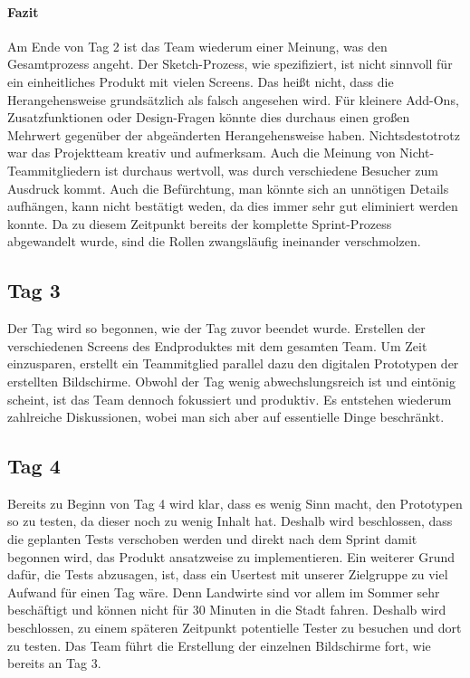 \paragraph{Fazit}
Am Ende von Tag 2 ist das Team wiederum einer Meinung, was den Gesamtprozess angeht. Der Sketch-Prozess, wie spezifiziert, ist nicht sinnvoll für ein einheitliches Produkt mit vielen Screens. Das heißt nicht, dass die Herangehensweise grundsätzlich als falsch angesehen wird. Für kleinere Add-Ons, Zusatzfunktionen oder Design-Fragen könnte dies durchaus einen großen Mehrwert gegenüber der abgeänderten Herangehensweise haben. Nichtsdestotrotz war das Projektteam kreativ und aufmerksam. Auch die Meinung von Nicht-Teammitgliedern ist durchaus wertvoll, was durch verschiedene Besucher zum Ausdruck kommt. Auch die Befürchtung, man könnte sich an unnötigen Details aufhängen, kann nicht bestätigt weden, da dies immer sehr gut eliminiert werden konnte. Da zu diesem Zeitpunkt bereits der komplette Sprint-Prozess abgewandelt wurde, sind die Rollen zwangsläufig ineinander verschmolzen.

\subsection*{\label{sec:Sprint-Umsetzung-Tag3}\thesubsection\quad Tag 3}Der Tag wird so begonnen, wie der Tag zuvor beendet wurde. Erstellen der verschiedenen Screens des Endproduktes mit dem gesamten Team. Um Zeit einzusparen, erstellt ein Teammitglied parallel dazu den digitalen Prototypen der erstellten Bildschirme. Obwohl der Tag wenig abwechslungsreich ist und eintönig scheint, ist das Team dennoch fokussiert und produktiv. Es entstehen wiederum zahlreiche Diskussionen, wobei man sich aber auf essentielle Dinge beschränkt.

\subsection*{\label{sec:Sprint-Umsetzung-Tag4}\thesubsection\quad Tag 4}Bereits zu Beginn von Tag 4 wird klar, dass es wenig Sinn macht, den Prototypen so zu testen, da dieser noch zu wenig Inhalt hat. Deshalb wird beschlossen, dass die geplanten Tests verschoben werden und direkt nach dem Sprint damit begonnen wird, das Produkt ansatzweise zu implementieren. Ein weiterer Grund dafür, die Tests abzusagen, ist, dass ein Usertest mit unserer Zielgruppe zu viel Aufwand für einen Tag wäre. Denn Landwirte sind vor allem im Sommer sehr beschäftigt und können nicht für 30 Minuten in die Stadt fahren. Deshalb wird beschlossen, zu einem späteren Zeitpunkt potentielle Tester zu besuchen und dort zu testen. Das Team führt die Erstellung der einzelnen Bildschirme fort, wie bereits an Tag 3.

